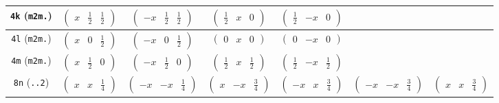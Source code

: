 \documentclass[fleqn,9pt,landscape]{jsarticle}
\begin{document}
\begin{center}
\begin{longtable}{ccccccc}
{\tt 4k} ({\tt m2m.}) & $ \begin{pmatrix} x & \frac{1}{2} & \frac{1}{2} \end{pmatrix} $ & $ \begin{pmatrix} - x & \frac{1}{2} & \frac{1}{2} \end{pmatrix} $ & $ \begin{pmatrix} \frac{1}{2} & x & 0 \end{pmatrix} $ & $ \begin{pmatrix} \frac{1}{2} & - x & 0 \end{pmatrix} $ & $  $ & $  $ \\ \hline
{\tt 4l} ({\tt m2m.}) & $ \begin{pmatrix} x & 0 & \frac{1}{2} \end{pmatrix} $ & $ \begin{pmatrix} - x & 0 & \frac{1}{2} \end{pmatrix} $ & $ \begin{pmatrix} 0 & x & 0 \end{pmatrix} $ & $ \begin{pmatrix} 0 & - x & 0 \end{pmatrix} $ & $  $ & $  $ \\ \hline
{\tt 4m} ({\tt m2m.}) & $ \begin{pmatrix} x & \frac{1}{2} & 0 \end{pmatrix} $ & $ \begin{pmatrix} - x & \frac{1}{2} & 0 \end{pmatrix} $ & $ \begin{pmatrix} \frac{1}{2} & x & \frac{1}{2} \end{pmatrix} $ & $ \begin{pmatrix} \frac{1}{2} & - x & \frac{1}{2} \end{pmatrix} $ & $  $ & $  $ \\ \hline
{\tt 8n} ({\tt ..2}) & $ \begin{pmatrix} x & x & \frac{1}{4} \end{pmatrix} $ & $ \begin{pmatrix} - x & - x & \frac{1}{4} \end{pmatrix} $ & $ \begin{pmatrix} x & - x & \frac{3}{4} \end{pmatrix} $ & $ \begin{pmatrix} - x & x & \frac{3}{4} \end{pmatrix} $ & $ \begin{pmatrix} - x & - x & \frac{3}{4} \end{pmatrix} $ & $ \begin{pmatrix} x & x & \frac{3}{4} \end{pmatrix} $ \\

\end{longtable}
\end{center}
\end{document}

